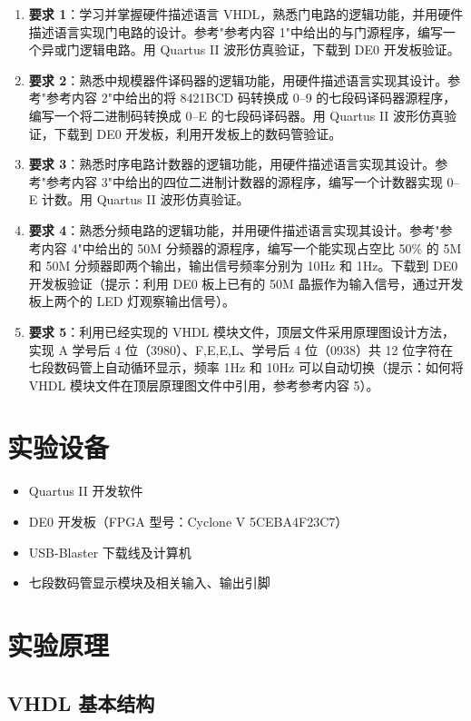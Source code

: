 \documentclass{ctexrep}
\begin{document}
\begin{enumerate}
    \item \textbf{要求 1}：学习并掌握硬件描述语言 VHDL，熟悉门电路的逻辑功能，并用硬件描述语言实现门电路的设计。参考"参考内容 1"中给出的与门源程序，编写一个异或门逻辑电路。用 Quartus II 波形仿真验证，下载到 DE0 开发板验证。
    \item \textbf{要求 2}：熟悉中规模器件译码器的逻辑功能，用硬件描述语言实现其设计。参考"参考内容 2"中给出的将 8421BCD 码转换成 0--9 的七段码译码器源程序，编写一个将二进制码转换成 0--E 的七段码译码器。用 Quartus II 波形仿真验证，下载到 DE0 开发板，利用开发板上的数码管验证。
    \item \textbf{要求 3}：熟悉时序电路计数器的逻辑功能，用硬件描述语言实现其设计。参考"参考内容 3"中给出的四位二进制计数器的源程序，编写一个计数器实现 0--E 计数。用 Quartus II 波形仿真验证。
    \item \textbf{要求 4}：熟悉分频电路的逻辑功能，并用硬件描述语言实现其设计。参考"参考内容 4"中给出的 50M 分频器的源程序，编写一个能实现占空比 50\% 的 5M 和 50M 分频器即两个输出，输出信号频率分别为 10Hz 和 1Hz。下载到 DE0 开发板验证（提示：利用 DE0 板上已有的 50M 晶振作为输入信号，通过开发板上两个的 LED 灯观察输出信号）。
    \item \textbf{要求 5}：利用已经实现的 VHDL 模块文件，顶层文件采用原理图设计方法，实现 A 学号后 4 位（3980）、F,E,E,L、学号后 4 位（0938）共 12 位字符在七段数码管上自动循环显示，频率 1Hz 和 10Hz 可以自动切换（提示：如何将 VHDL 模块文件在顶层原理图文件中引用，参考参考内容 5）。
\end{enumerate}

\section{实验设备}

\begin{itemize}
    \item Quartus II 开发软件
    \item DE0 开发板（FPGA 型号：Cyclone V 5CEBA4F23C7）
    \item USB-Blaster 下载线及计算机
    \item 七段数码管显示模块及相关输入、输出引脚
\end{itemize}

\section{实验原理}

\subsection{VHDL 基本结构}
\end{document}
